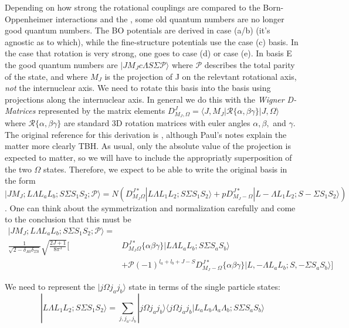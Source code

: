 \documentclass[prl, longbibliography, aps, 10pt]{revtex4-2}
\begin{document}
Depending on how strong the rotational couplings are compared to the Born-Oppenheimer interactions and the , some old quantum numbers are no longer good quantum numbers. The BO potentials are derived in case (a/b) (it's agnostic as to which), while the fine-structure potentials use the case (c) basis. In the case that rotation is very strong, one goes to case (d) or case (e). In basis E the good quantum numbers are $|J M_J c \Lambda S \Sigma \mathcal{P} \rangle $ where $\mathcal{P}$ describes the total parity of the state, and where $M_J$ is the projection of J on the relevtant rotational axis, \emph{not} the internuclear axis. We need to rotate this basis into the basis using projections along the internuclear axis. In general we do this with the \emph{Wigner D-Matrices} represented by the matrix elements $D^J_{M_J,\Omega}=\langle J,M_J|\mathcal{R}\{\alpha,\beta\gamma\}|J, \Omega\rangle$ where $\mathcal{R}\{\alpha,\beta\gamma\}$ are standard 3D rotation matrices with euler angles $\alpha, \beta,$ and $\gamma$. The original reference for this derivation is \cite{singer_theory_1983}, although Paul's notes explain the matter more clearly TBH. 
As usual, only the absolute value of the projection is expected to matter, so we will have to include the appropriatly superposition of the two $\Omega$ states. 
Therefore, we expect to be able to write the original basis in the form $|J M_J; L \Lambda L_a L_b; S \Sigma  S_1 S_2; \mathcal{P} \rangle=N(D^{J*}_{M_J\Omega}|L \Lambda L_1 L_2; S \Sigma S_1 S_2\rangle+pD^{J*}_{M_J-\Omega}|L -\Lambda L_1 L_2; S -\Sigma S_1 S_2\rangle)$. One can think about the symmetrization and normalization carefully and come to the conclusion that this must be
\begin{equation}
\begin{split}
|J M_J; L \Lambda L_a L_b; S \Sigma  S_1 S_2; \mathcal{P} \rangle=\\
\frac{1}{\sqrt{2-\delta_{\Lambda 0}\delta_{\Sigma 0}}}\sqrt{\frac{2J+1}{8\pi^3}}\bigg[&D^{J*}_{M_J\Omega}\{\alpha \beta \gamma\}|L \Lambda L_a L_b; S \Sigma S_a S_b\rangle\\
&+\mathcal{P}(-1)^{l_a+l_b+J-S}D^{J*}_{M_J-\Omega}\{\alpha \beta \gamma\}|L, -\Lambda L_a L_b; S, -\Sigma S_a S_b\rangle\bigg]
\end{split}
\end{equation}

We need to represent the $|j\Omega j_a j_b\rangle$ state in terms of the single particle states:
\begin{equation}
|L \Lambda L_1 L_2; S \Sigma S_1 S_2\rangle = \sum_{j, j_a, j_b} |j\Omega j_a j_b\rangle\langle j\Omega j_a j_b | L_a L_b \Lambda_a \Lambda_b; S\Sigma S_a S_b\rangle
\end{equation}
\end{document}
